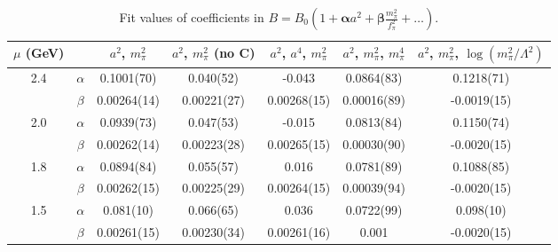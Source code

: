 \documentclass[12pt]{extarticle}
\begin{document}
\begin{table}[h!]
\begin{center}
\begin{tabular}{|c c|c|c|c|c|c|}
\hline
$\mu$ (GeV) &  & $a^2$, $m_\pi^2$& $a^2$, $m_\pi^2$ (no C)& $a^2$, $a^4$, $m_\pi^2$& $a^2$, $m_\pi^2$, $m_\pi^4$& $a^2$, $m_\pi^2$, $\log(m_\pi^2/\Lambda^2)$\\
\hline
\multirow{2}{0.5in}{2.4} & $\alpha$ & 0.1001(70)& 0.040(52)& -0.043& 0.0864(83)& 0.1218(71)\\
 & $\beta$ & 0.00264(14)& 0.00221(27)& 0.00268(15)& 0.00016(89)& -0.0019(15)\\
\hline
\multirow{2}{0.5in}{2.0} & $\alpha$ & 0.0939(73)& 0.047(53)& -0.015& 0.0813(84)& 0.1150(74)\\
 & $\beta$ & 0.00262(14)& 0.00223(28)& 0.00265(15)& 0.00030(90)& -0.0020(15)\\
\hline
\multirow{2}{0.5in}{1.8} & $\alpha$ & 0.0894(84)& 0.055(57)& 0.016& 0.0781(89)& 0.1088(85)\\
 & $\beta$ & 0.00262(15)& 0.00225(29)& 0.00264(15)& 0.00039(94)& -0.0020(15)\\
\hline
\multirow{2}{0.5in}{1.5} & $\alpha$ & 0.081(10)& 0.066(65)& 0.036& 0.0722(99)& 0.098(10)\\
 & $\beta$ & 0.00261(15)& 0.00230(34)& 0.00261(16)& 0.001& -0.0020(15)\\
\hline
\end{tabular}
\caption{Fit values of coefficients in $B = B_0(1 + \mathbf{\alpha} a^2 + \mathbf{\beta} \frac{m_\pi^2}{f_\pi^2} + \ldots)$.}
\end{center}
\end{table}




















\clearpage
\end{document}
